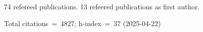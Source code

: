 74 refereed publications. 13 refeered publications as first author.

Total citations~=~4827; h-index~=~37 (2025-04-22)